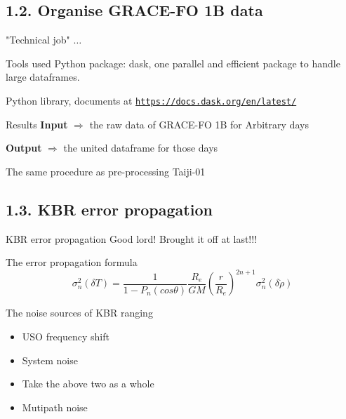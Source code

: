 \documentclass[12pt,english,ignorenonframetext,]{beamer}
\begin{document}
\subsection{\hfill{}1.2. Organise GRACE-FO 1B data \hfill{}}

\begin{frame}{"Technical job" $\dots$}
	\begin{block}{Tools used}
		Python package: dask, one parallel and efficient package to handle large dataframes.
		
		Python library, documents at
		\href{https://SMPyBandits.GitHub.io}{\texttt{https://docs.dask.org/en/latest/}}
	\end{block}

	\begin{block}{Results}
		\textbf{Input} $\Longrightarrow$ the raw data of GRACE-FO 1B for Arbitrary days
		
		\textbf{Output} $\Longrightarrow$ the united dataframe for those days
		
		The same procedure as pre-processing Taiji-01
	\end{block}
\end{frame}

\subsection{\hfill{}1.3. KBR error propagation \hfill{}}

\begin{frame}{KBR error propagation}
	Good lord! Brought it off at last!!!
	\begin{block}{The error propagation formula}
		\begin{equation}
			\sigma _{n}^{2}\left( \delta T \right) =\frac{1}{1-P_n\left( cos\theta \right)}\frac{R_e}{GM}\left( \frac{r}{R_e} \right) ^{2n+1}\sigma _{n}^{2}\left( \delta \dot{\rho} \right) 
		\end{equation}
	\end{block}
	
	\begin{block}{The noise sources of KBR ranging}
		\begin{itemize}
			\item USO frequency shift
			\item System noise
			\item Take the above two as a whole
			\item Mutipath noise
		\end{itemize}
	\end{block}
\end{frame}
\end{document}
